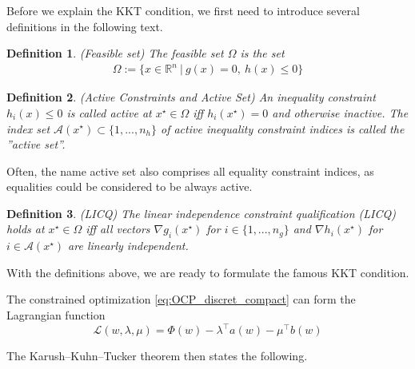 \documentclass  [
  paper    = a4,
  BCOR     = 10mm,
  twoside,
  fontsize = 12pt,
  fleqn,
  toc      = bibnumbered,
  toc      = listofnumbered,
  numbers  = noendperiod,
  headings = normal,
  listof   = leveldown,
  version  = 3.03
]                                       {scrreprt}
\newcommand{\<}{\langle}
\renewcommand{\>}{\rangle}
\newtheorem{definition}{Definition}
\begin{document}
Before we explain the KKT condition, we first need to introduce several definitions in the following text. 
\begin{definition}(Feasible set) The feasible set $\Omega$ is the set 
	\begin{align}
		\Omega:= \{x \in \mathbb{R}^n \ | \ g(x)= 0 , \ h(x)	\leq 0 \}	
	\end{align}
\end{definition}	

\begin{definition}(Active Constraints and Active Set) An inequality constraint $h_i(x) \leq 0$ is called active at $x^\star \in  \Omega$  iff  $h_i(x^\star) = 0$ and otherwise inactive. The index set $\mathcal{A}(x^\star) \subset \{1, ..., n_h\}$  of active inequality constraint indices is called the ”active set”.
\end{definition}
Often, the name active set also comprises all equality constraint indices, as equalities could be considered to be
always active. 
\begin{definition} (LICQ) The linear independence constraint qualification (LICQ) holds at $x^\star \in  \Omega $ iff all vectors $\nabla g_i(x^\star)$ for $i \in \{1, ..., n_g \}$ and $\nabla h_i(x^\star)$ for  $i \in \mathcal{A}(x^\star)$ are linearly independent.
\end{definition}

With the definitions above, we are ready to formulate the famous KKT condition. 


The constrained optimization \ref{eq:OCP_discret_compact} can form the Lagrangian function
\begin{equation}
	 \mathcal{L}(w,\lambda, \mu) = \Phi(w) - \lambda ^\top a(w)-  \mu^\top b(w) 
\end{equation}






The Karush–Kuhn–Tucker theorem then states the following.


   
   
   
   
   
\end{document}
